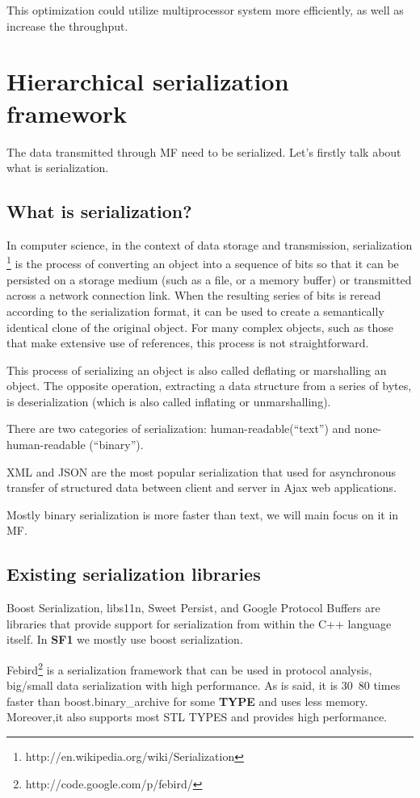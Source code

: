 \documentclass[a4paper,10pt]{article}
\begin{document}
This optimization could utilize multiprocessor system more efficiently,  as well as increase the throughput.

\section{Hierarchical serialization framework}
The data transmitted through MF need to be serialized. Let's firstly
talk about what is serialization.
\subsection{What is serialization? }
 In computer science, in the context of data storage and
transmission, serialization
\footnote{http://en.wikipedia.org/wiki/Serialization} is the process
of converting an object into a sequence of bits so that it can be
persisted on a storage medium (such as a file, or a memory buffer)
or transmitted across a network connection link. When the resulting
series of bits is reread according to the serialization format, it
can be used to create a semantically identical clone of the original
object. For many complex objects, such as those that make extensive
use of references, this process is not straightforward.

This process of serializing an object is also called deflating or marshalling an object. The opposite operation, extracting a data structure from a series of bytes, is deserialization (which is also called inflating or unmarshalling).


There are two categories of serialization: human-readable(“text”) and none-human-readable (“binary”).

XML and JSON are the most popular serialization that used for
asynchronous transfer of structured data between client and server
in Ajax web applications.

Mostly binary serialization is more faster than text, we will main
focus on it in MF.
\subsection{Existing serialization libraries }

Boost Serialization, libs11n, Sweet Persist, and Google Protocol
Buffers are libraries that provide support for serialization from
within the C++ language itself. In \textbf{SF1} we mostly use boost
serialization.

 Febird\footnote{http://code.google.com/p/febird/} is
a serialization framework that can be used in protocol analysis,
big/small data serialization with high performance. As is said, it
is 30~80 times faster than boost.binary\_archive for some
\textbf{TYPE} and uses less memory. Moreover,it also supports most
STL TYPES and provides high performance.
\end{document}
